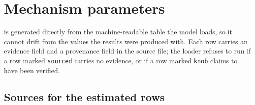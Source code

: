 \section{Mechanism parameters}
\label{app:parameters}

 is generated directly from the machine-readable table the
model loads, so it cannot drift from the values the results were produced with.
Each row carries an evidence field and a provenance field in the source file; the
loader refuses to run if a row marked \texttt{sourced} carries no evidence, or if
a row marked \texttt{knob} claims to have been verified.

\begin{table}[h]
\centering
\footnotesize

\caption{All \MechanismParameterCount{} mechanism parameters. Of these,
\MechanismSourcedCount{} are estimated from published sources and checked against
them, and \MechanismKnobCount{} are scenario knobs with no independent support.
The range column is propagated through the main paper's parameter ensemble and boundary grid; it is a stated
plausible interval across settings, not a confidence interval from a single
study.}
\label{tab:parameters}
\end{table}

\subsection*{Sources for the estimated rows}

